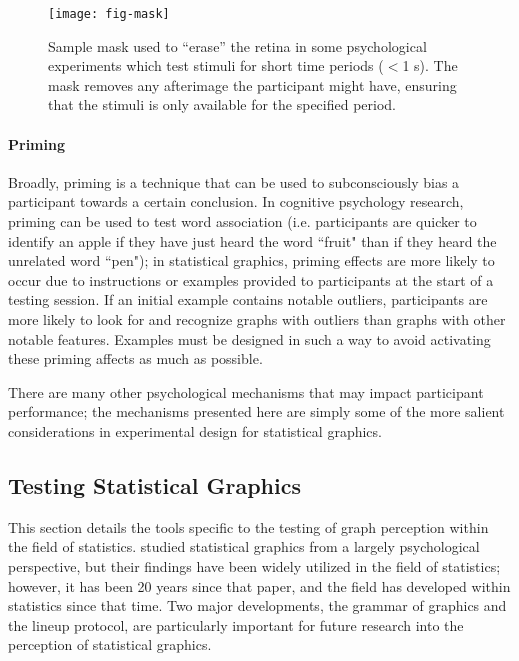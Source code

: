 \documentclass[11pt]{isuthesis}\usepackage[]{graphicx}\usepackage[]{color}
\begin{document}
\begin{figure}[htbp]\centering
\texttt{[image: fig-mask]}
\caption[Sample image mask]{Sample mask used to ``erase'' the retina in some psychological experiments which test stimuli for short time periods ($<$1 s). The mask removes any afterimage the participant might have, ensuring that the stimuli is only available for the specified period. }\label{fig:mask}
\end{figure}

\paragraph{Priming} Broadly, priming is a technique that can be used to subconsciously bias a participant towards a certain conclusion. In cognitive psychology research, priming can be used to test word association (i.e. participants are quicker to identify an apple if they have just heard the word ``fruit" than if they heard the unrelated word ``pen"); in statistical graphics, priming effects are more likely to occur due to instructions or examples provided to participants at the start of a testing session. If an initial example contains notable outliers, participants are more likely to look for and recognize graphs with outliers than graphs with other notable features. Examples must be designed in such a way to avoid activating these priming affects as much as possible. 

There are many other psychological mechanisms that may impact participant performance; the mechanisms presented here are simply some of the more salient considerations in experimental design for statistical graphics. 

\subsection{Testing Statistical Graphics}
This section details the tools specific to the testing of graph perception within the field of statistics. \citet{cleveland:1985} studied statistical graphics from a largely psychological perspective, but their findings have been widely utilized in the field of statistics; however, it has been 20 years since that paper, and the field has developed within statistics since that time. Two major developments, the grammar of graphics and the lineup protocol, are particularly important for future research into the perception of statistical graphics. 
\end{document}
